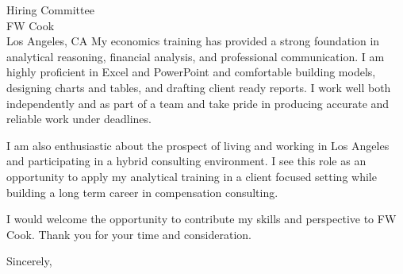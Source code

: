 \documentclass[11pt]{letter}
\begin{document}
\begin{letter}{Hiring Committee \\ FW Cook \\ Los Angeles, CA}
My economics training has provided a strong foundation in analytical reasoning, financial analysis, and professional communication. I am highly proficient in Excel and PowerPoint and comfortable building models, designing charts and tables, and drafting client ready reports. I work well both independently and as part of a team and take pride in producing accurate and reliable work under deadlines.

I am also enthusiastic about the prospect of living and working in Los Angeles and participating in a hybrid consulting environment. I see this role as an opportunity to apply my analytical training in a client focused setting while building a long term career in compensation consulting.

I would welcome the opportunity to contribute my skills and perspective to FW Cook. Thank you for your time and consideration.

\closing{Sincerely,}

\end{letter}
\end{document}
